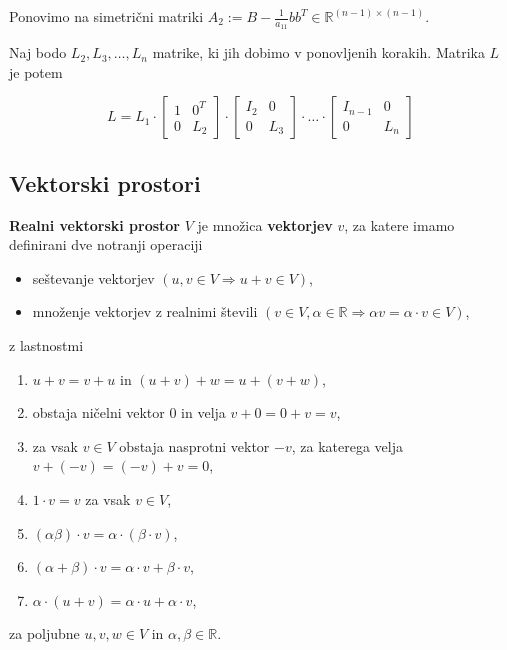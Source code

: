 \documentclass{article}
\begin{document}
\begin{multicols}{2}
	Ponovimo na simetrični matriki \( A_2 := B - \frac{1}{a_{11}} bb^T \in \mathbb{R}^{(n-1) \times (n-1)} \).

	Naj bodo \( L_2, L_3, \ldots, L_n \) matrike, ki jih dobimo v ponovljenih korakih. Matrika \( L \) je potem

	\[
		L = L_1 \cdot \left[ \begin{array}{cc}
				1 & 0^T \\
				0 & L_2
			\end{array} \right] \cdot \left[ \begin{array}{cc}
				I_2 & 0   \\
				0   & L_3
			\end{array} \right] \cdot \ldots \cdot \left[ \begin{array}{cc}
				I_{n-1} & 0   \\
				0       & L_n
			\end{array} \right]
	\]

	\subsection{Vektorski prostori}

	\textbf{Realni vektorski prostor} \( V \) je množica \textbf{vektorjev} \( v \), za katere imamo definirani dve notranji operaciji
	\begin{itemize}
		\item seštevanje vektorjev \( (u, v \in V \Rightarrow u+v \in V) \),
		\item množenje vektorjev z realnimi števili \( (v \in V, \alpha \in \mathbb{R} \Rightarrow \alpha v = \alpha \cdot v \in V) \),
	\end{itemize}
	z lastnostmi
	\begin{enumerate}
		\item \( u + v = v + u \) in \( (u + v) + w = u + (v + w) \),
		\item obstaja ničelni vektor \( 0 \) in velja \( v + 0 = 0 + v = v \),
		\item za vsak \( v \in V \) obstaja nasprotni vektor \( -v \), za katerega velja \( v + (-v) = (-v) + v = 0 \),
		\item \( 1 \cdot v = v \) za vsak \( v \in V \),
		\item \( (\alpha\beta) \cdot v = \alpha \cdot (\beta \cdot v) \),
		\item \( (\alpha + \beta) \cdot v = \alpha \cdot v + \beta \cdot v \),
		\item \( \alpha \cdot (u + v) = \alpha \cdot u + \alpha \cdot v \),
	\end{enumerate}
	za poljubne \( u, v, w \in V \) in \( \alpha, \beta \in \mathbb{R} \).



\end{multicols}
\end{document}
